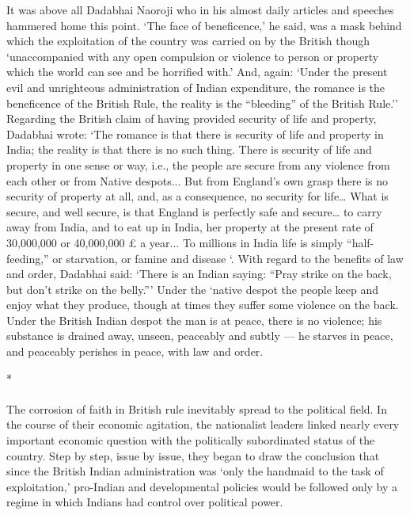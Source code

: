 It was above all Dadabhai Naoroji who in his almost daily articles and speeches hammered home this point. `The face of beneficence,' he said, was a mask behind which the exploitation of the country was carried on by the British though `unaccompanied with any open compulsion or violence to person or property which the world can see and be horrified with.' And, again: `Under the present evil and unrighteous administration of Indian expenditure, the romance is the beneficence of the British Rule, the reality is the ``bleeding'' of the British Rule.'' Regarding the British claim of having provided security of life and property, Dadabhai wrote: `The romance is that there is security of life and property in India; the reality is that there is no such thing. There is security of life and property in one sense or way, i.e., the people are secure from any violence from each other or from Native despots... But from England's own grasp there is no security of property at all, and, as a consequence, no security for life… What is secure, and well secure, is that England is perfectly safe and secure… to carry away from India, and to eat up in India, her property at the present rate of 30,000,000 or 40,000,000 £ a year... To millions in India life is simply ``half-feeding,'' or starvation, or famine and disease `. With regard to the benefits of law and order, Dadabhai said: `There is an Indian saying: ``Pray strike on the back, but don't strike on the belly.''' Under the `native despot the people keep and enjoy what they produce, though at times they suffer some violence on the back. Under the British Indian despot the man is at peace, there is no violence; his substance is drained away, unseen, peaceably and subtly — he starves in peace, and peaceably perishes in peace, with law and order.

\begin{center}*\end{center}

\paragraph*{}


The corrosion of faith in British rule inevitably spread to the political field. In the course of their economic agitation, the nationalist leaders linked nearly every important economic question with the politically subordinated status of the country. Step by step, issue by issue, they began to draw the conclusion that since the British Indian administration was `only the handmaid to the task of exploitation,' pro-Indian and developmental policies would be followed only by a regime in which Indians had control over political power.

